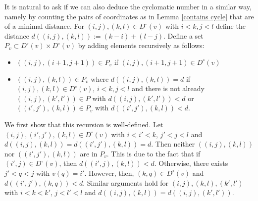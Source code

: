 \documentclass[11pt]{amsart}
\theoremstyle{definition}
\theoremstyle{definition}
\theoremstyle{definition}
\theoremstyle{definition}
\newcommand{\Dc}{D^{\circ}}
\begin{document}
It is natural to ask if we can also deduce the cyclomatic number in a similar way, namely by counting the pairs of coordinates as in Lemma \ref{contains cycle} that are of a minimal distance. 
For $(i,j),(k,l)\in \Dc(v)$ with $i<k,j<l$ define the distance 
$d((i,j),(k,l)) := (k-i) + (l-j)$.
Define a set $P_v \subset \Dc(v) \times \Dc(v)$ by adding elements recursively as follows:
\begin{itemize}
\item  $((i,j),(i+1,j+1)) \in P_v$ if $(i,j),(i+1,j+1) \in \Dc(v)$ 
\item $((i,j),(k,l)) \in P_v$ where $d((i,j),(k,l)) = d$ if $(i,j),(k,l) \in \Dc(v)$, $i<k, j<l$ and there is not already $((i,j),(k',l'))\in P$ with $d((i,j),(k',l')) < d$ or $((i',j'),(k,l))\in P_v$ with $d((i',j'),(k,l)) <d$.
\end{itemize}
We first show that this recursion is well-defined. Let $(i,j),(i',j'),(k,l) \in \Dc(v)$ with $i<i'<k$, $j' < j < l$ and $d((i,j),(k,l)) = d((i',j'),(k,l)) = d$. Then neither $((i,j),(k,l))$ nor $((i',j'),(k,l))$ are in $P_v$. This is due to the fact that if $(i',j)\in \Dc(v)$, then $d((i',j),(k,l)) < d$. Otherwise, there exists $j' <q<j$ with $v(q) = i'$. However, then, $(k,q)\in \Dc(v)$ and $d((i',j'),(k,q)) < d$. Similar arguments hold for $(i,j),(k,l),(k',l')$ with $i<k<k'$, $j<l'<l$ and $d((i,j),(k,l))=d((i,j),(k',l'))$.
\end{document}
